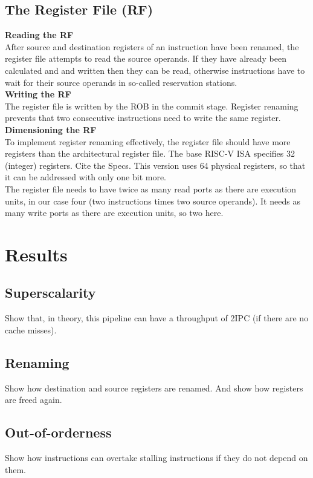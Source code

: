 \documentclass[12pt,a4paper]{article}
\newcommand{\note}{\textcolor{WildStrawberry}}
\begin{document}
\subsection{The Register File (RF)}
\textbf{Reading the RF}\\
After source and destination registers of an instruction have been renamed, the register file attempts to read the source operands. If they have already been calculated and and written then they can be read, otherwise instructions have to wait for their source operands in so-called reservation stations.\\

\textbf{Writing the RF}\\
The register file is written by the ROB in the commit stage. Register renaming prevents that two consecutive instructions need to write the same register.\\

\textbf{Dimensioning the RF}\\
To implement register renaming effectively, the register file should have more registers than the architectural register file. The base RISC-V ISA specifies 32 (integer) registers. \note{Cite the Specs.} This version uses 64 physical registers, so that it can be addressed with only one bit more. \\
The register file needs to have twice as many read ports as there are execution units, in our case four (two instructions times two source operands). It needs as many write ports as there are execution units, so two here.

\newpage
\section{Results}

\subsection{Superscalarity}
Show that, in theory, this pipeline can have a throughput of 2IPC (if there are no cache misses).
\subsection{Renaming}
Show how destination and source registers are renamed. And show how registers are freed again.
\subsection{Out-of-orderness}
Show how instructions can overtake stalling instructions if they do not depend on them.
\end{document}
